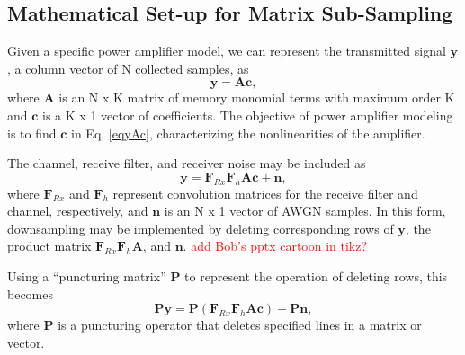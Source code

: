 \documentclass[11pt,onecolumn]{IEEEtran}
\begin{document}
\subsection{Mathematical Set-up for Matrix Sub-Sampling}
Given a specific power amplifier model, we can represent the transmitted signal $\boldsymbol{y}$, a column vector of N collected samples, as 
\begin{equation} \label{eqyAc}
\boldsymbol{y} = \boldsymbol{Ac},
\end{equation}
where $\boldsymbol{A}$ is an N x K matrix of memory monomial terms with maximum order K and $\boldsymbol{c}$ is a K x 1 vector of coefficients.  The objective of power amplifier modeling is to find $\boldsymbol{c}$ in Eq. \ref{eqyAc}, characterizing the nonlinearities of the amplifier. 

The channel,  receive filter, and receiver noise may be included as
\begin{equation}\label{eqyFrxh}
\boldsymbol{y} = \boldsymbol{F}_{Rx}\boldsymbol{F}_h\boldsymbol{Ac} + \boldsymbol{n},
\end{equation}
where $\boldsymbol{F}_{Rx}$ and $\boldsymbol{F}_h$ represent convolution matrices for the receive filter and channel, respectively, and $\boldsymbol{n}$ is an N x 1 vector of AWGN samples.  In this form, downsampling may be implemented by deleting corresponding rows of $\boldsymbol{y}$, the product matrix $\boldsymbol{F}_{Rx}\boldsymbol{F}_h\boldsymbol{A}$, and $\boldsymbol{n}$.  \textcolor{red}{ add Bob's pptx cartoon in tikz?}
 
Using a ``puncturing matrix'' $\boldsymbol{P}$ to represent the operation of deleting rows, this becomes										\begin{equation}\label{eqPy}
\boldsymbol{Py} = \boldsymbol{P}(\boldsymbol{F}_{Rx}\boldsymbol{F}_h\boldsymbol{Ac}) + \boldsymbol{Pn},
\end{equation}
where $\boldsymbol{P}$ is a puncturing operator that deletes specified lines in a matrix or vector.
\\
\end{document}
